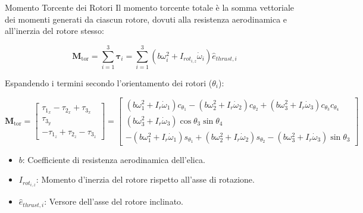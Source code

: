 \documentclass[aspectratio=169]{beamer} %
\begin{document}
\begin{frame}{Momento Torcente dei Rotori}
    Il momento torcente totale è la somma vettoriale dei momenti generati da ciascun rotore, dovuti alla resistenza aerodinamica e all'inerzia del rotore stesso:
    
    \begin{equation*}
        \bm{M}_{\text{tor}} = \sum_{i=1}^{3} \bm{\tau}_i = \sum_{i=1}^{3} (b \omega_i^2 + I_{rot_{i,z}} \dot{\omega}_i) \hat{e}_{thrust,i}
    \end{equation*}

    Espandendo i termini secondo l'orientamento dei rotori ($\theta_i$):

    \begin{equation}
        \bm{M}_{\text{tor}} = 
        \begin{bmatrix} 
        \tau_{1_x} - \tau_{2_x} + \tau_{3_x} \\ 
        \tau_{3_y} \\ 
        -\tau_{1_z} + \tau_{2_z} - \tau_{3_z} 
        \end{bmatrix} =
        \begin{bmatrix} 
        (b\omega_1^2 + I_{r}\dot{\omega}_1) c_{\theta_1} - (b\omega_2^2 + I_{r}\dot{\omega}_2) c_{\theta_2} + (b\omega_3^2 + I_{r}\dot{\omega}_3) c_{\theta_3} c_{\theta_4} \\ 
        (b\omega_3^2 + I_{r}\dot{\omega}_3) \cos\theta_3 \sin\theta_4 \\ 
        -(b\omega_1^2 + I_{r}\dot{\omega}_1) s_{\theta_1} + (b\omega_2^2 + I_{r}\dot{\omega}_2) s_{\theta_2} - (b\omega_3^2 + I_{r}\dot{\omega}_3) \sin\theta_3
        \end{bmatrix}
    \end{equation}

    \begin{itemize}
        \item $b$: Coefficiente di resistenza aerodinamica dell'elica.
        \item $I_{rot_{i,z}}$: Momento d'inerzia del rotore rispetto all'asse di rotazione.
        \item $\hat{e}_{thrust,i}$: Versore dell'asse del rotore inclinato.
    \end{itemize}
\end{frame}
\end{document}
